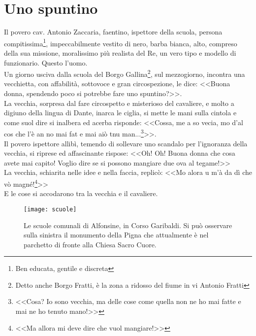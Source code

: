 
\chapter{Uno spuntino}
Il povero cav. Antonio Zaccaria, faentino, ispettore della scuola, persona compitissima\footnote{Ben educata, gentile e discreta}, impeccabilmente vestito di nero, barba bianca, alto, compreso della sua missione, moralissimo più realista del Re, un vero tipo e modello di funzionario. Questo l'uomo.\\
\indent Un giorno usciva dalla scuola del Borgo Gallina\footnote{Detto anche Borgo Fratti, è la zona a ridosso del fiume in vi Antonio Fratti}, sul mezzogiorno, incontra una vecchietta, con affabilità, sottovoce e gran circospezione, le dice: <<Buona donna, spendendo poco si potrebbe fare uno spuntino?>>.\\
\indent La vecchia, sorpresa dal fare circospetto e misterioso del cavaliere, e molto a digiuno della lingua di Dante, inarca le ciglia, si mette le mani sulla cintola e come suol dire si inalbera ed acerba risponde: <<Cossa, me a so vecia, mo d'al cos che l'è an no mai fat e mai aiò tnu man...\footnote{<<Cosa? Io sono vecchia, ma delle cose come quella non ne ho mai fatte e mai ne ho tenuto mano!>>}>>.\\
\indent Il povero ispettore allibì, temendo di sollevare uno scandalo per l'ignoranza della vecchia, si riprese ed affascinante rispose: <<Oh! Oh! Buona donna che cosa avete mai capito! Voglio dire se si possono mangiare due ova al tegame!>>\\
\indent La vecchia, schiarita nelle idee e nella faccia, replicò: <<Mo alora u m'à da dì che vò magné!\footnote{<<Ma allora mi deve dire che vuol mangiare!>>}>>\\
\indent E le cose si accodarono tra la vecchia e il cavaliere.

 \begin{figure}[htb]
    \centering
    \texttt{[image: scuole]}
    \caption[Scuole Comunali]{Le scuole comunali di Alfonsine, in Corso Garibaldi. Si può osservare sulla sinistra il monumento della Pigna che attualmente è nel parchetto di fronte alla Chiesa Sacro Cuore.\label{fig:scuole}}
\end{figure}